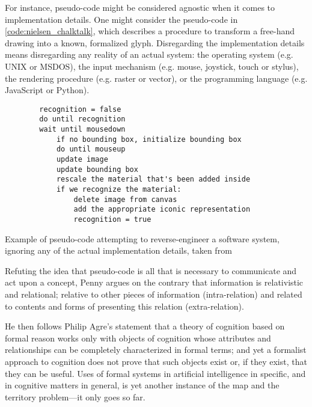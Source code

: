 For instance, pseudo-code might be considered agnostic when it comes to implementation details. One might consider the pseudo-code in \ref{code:nielsen_chalktalk}, which describes a procedure to transform a free-hand drawing into a known, formalized glyph. Disregarding the implementation details means disregarding any reality of an actual system: the operating system (e.g. UNIX or MSDOS), the input mechanism (e.g. mouse, joystick, touch or stylus), the rendering procedure (e.g. raster or vector), or the programming language (e.g. JavaScript or Python).

\begin{listing}
    \begin{verbatim}
        recognition = false
        do until recognition
        wait until mousedown
            if no bounding box, initialize bounding box
            do until mouseup
            update image
            update bounding box
            rescale the material that's been added inside
            if we recognize the material:
                delete image from canvas
                add the appropriate iconic representation
                recognition = true
    \end{verbatim}
    \caption[]{Example of pseudo-code attempting to reverse-engineer a software system, ignoring any of the actual implementation details, taken from \citep{nielsen_working_2017}}
    \label{code:nielsen_chalktalk}
\end{listing}

Refuting the idea that pseudo-code is all that is necessary to communicate and act upon a concept, Penny  argues on the contrary that information is relativistic and relational; relative to other pieces of information (intra-relation) and related to contents and forms of presenting this relation (extra-relation).

He then follows Philip Agre's statement that a theory of cognition based on formal reason works only with objects of cognition whose attributes and relationships can be completely characterized in formal terms; and yet a formalist approach to cognition does not prove that such objects exist or, if they exist, that they can be useful. Uses of formal systems in artificial intelligence in specific, and in cognitive matters in general, is yet another instance of the map and the territory problem—it only goes so far.

